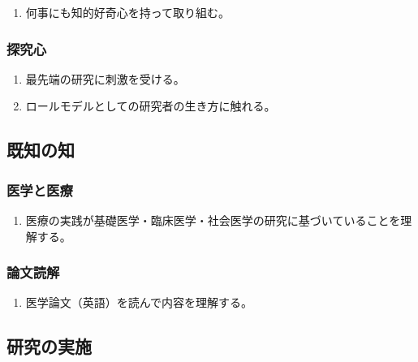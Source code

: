 \begin{enumerate}
\def\labelenumi{\arabic{enumi}.}
\tightlist
\item
  何事にも知的好奇心を持って取り組む。
\end{enumerate}

\hypertarget{ux63a2ux7a76ux5fc3}{%
\subsubsection{探究心}\label{ux63a2ux7a76ux5fc3}}

\begin{enumerate}
\def\labelenumi{\arabic{enumi}.}
\tightlist
\item
  最先端の研究に刺激を受ける。
\item
  ロールモデルとしての研究者の生き方に触れる。
\end{enumerate}

\hypertarget{ux65e2ux77e5ux306eux77e5}{%
\subsection{既知の知}\label{ux65e2ux77e5ux306eux77e5}}

\hypertarget{ux533bux5b66ux3068ux533bux7642}{%
\subsubsection{医学と医療}\label{ux533bux5b66ux3068ux533bux7642}}

\begin{enumerate}
\def\labelenumi{\arabic{enumi}.}
\tightlist
\item
  医療の実践が基礎医学・臨床医学・社会医学の研究に基づいていることを理解する。
\end{enumerate}

\hypertarget{ux8ad6ux6587ux8aadux89e3}{%
\subsubsection{論文読解}\label{ux8ad6ux6587ux8aadux89e3}}

\begin{enumerate}
\def\labelenumi{\arabic{enumi}.}
\tightlist
\item
  医学論文（英語）を読んで内容を理解する。
\end{enumerate}

\hypertarget{ux7814ux7a76ux306eux5b9fux65bd}{%
\subsection{研究の実施}\label{ux7814ux7a76ux306eux5b9fux65bd}}

